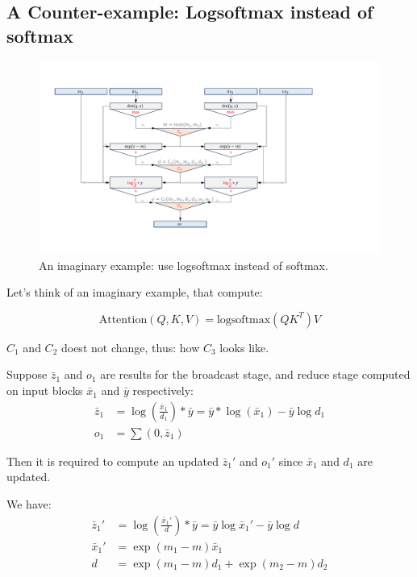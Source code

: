 \subsection{A Counter-example: Logsoftmax instead of softmax}

\begin{figure}[h]
    \centering
    \includegraphics[width=1\textwidth]{figures/attention_expression_tree3.pdf}
    \caption{An imaginary example: use logsoftmax instead of softmax.}
\end{figure}

Let's think of an imaginary example, that compute:

$$\text{Attention}(Q, K, V) = \text{logsoftmax}(QK^T)V$$

$C_1$ and $C_2$ doest not change, thus: how $C_3$ looks like.

Suppose $\bar{z}_1$ and $o_1$ are results for the broadcast stage, and reduce stage computed on input blocks $\bar{x}_1$ and $\bar{y}$ respectively:
\begin{align*}
\bar{z}_1 &= \log\left(\frac{\bar{x}_1}{d_1}\right)*\bar{y} = \bar{y}*\log(\bar{x}_1) -\bar{y}\log d_1\\
o_1 &= \sum(0, \bar{z}_1)
\end{align*}

Then it is required to compute an updated $\bar{z}_1'$ and $o_1'$ since $\bar{x}_1$ and $d_1$ are updated.

We have:
\begin{align*}
    \bar{z}_1'&=\log \left(\frac{\bar{x}_1'}{d}\right) * \bar{y} = \bar{y}\log\bar{x}_1' - \bar{y}\log d \\
    \bar{x}_1' &= \exp(m_1 - m)\bar{x}_1 \\
    d &= \exp(m_1 -m)d_1 + \exp(m_2 -m)d_2
\end{align*}

